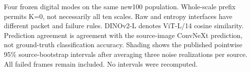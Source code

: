 Four frozen digital modes on the same new100 population. Whole-scale prefix permits K=0, not necessarily all ten scales. Raw and entropy interfaces have different packet and failure rules. DINOv2-L denotes ViT-L/14 cosine similarity. Prediction agreement is agreement with the source-image ConvNeXt prediction, not ground-truth classification accuracy. Shading shows the published pointwise 95\% source-bootstrap intervals after averaging three noise realizations per source. All failed frames remain included. No intervals were recomputed.
